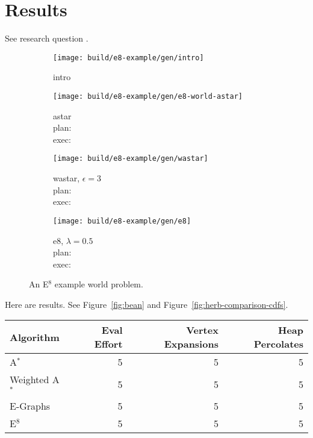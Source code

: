 \section{Results}

See research question \label{ques:e8-comparisons}.

\begin{figure}
   \centering
   
   
   
   \begin{subfigure}[t]{0.47\textwidth}
      \centering
      \texttt{[image: build/e8-example/gen/intro]}
      \caption{intro}
   \end{subfigure}%
   \quad%
   \begin{subfigure}[t]{0.47\textwidth}
      \centering
      \texttt{[image: build/e8-example/gen/e8-world-astar]}
      \caption{astar\\
         plan: \worldstatsastarplan\\
         exec: \worldstatsastarexec}
   \end{subfigure}%
   \quad%
   \begin{subfigure}[t]{0.47\textwidth}
      \centering
      \texttt{[image: build/e8-example/gen/wastar]}
      \caption{wastar, $\epsilon=3$\\
         plan: \worldstatswastarplan\\
         exec: \worldstatswastarexec}
   \end{subfigure}%
   \quad%
   \begin{subfigure}[t]{0.47\textwidth}
      \centering
      \texttt{[image: build/e8-example/gen/e8]}
      \caption{e8, $\lambda=0.5$\\
         plan: \worldstatseEplan\\
         exec: \worldstatseEexec}
   \end{subfigure}
   \caption{An E$^8$ example world problem.}
\end{figure}

Here are results.
See Figure~\ref{fig:bean} and Figure~\ref{fig:herb-comparison-cdfs}.

\begin{center}
\begin{tabular}{lrrr}
\toprule
Algorithm & Eval Effort & Vertex Expansions & Heap Percolates \\
\midrule
A$^*$ & 5 & 5 & 5 \\
Weighted A$^*$ & 5 & 5 & 5 \\
E-Graphs & 5 & 5 & 5 \\
E$^8$ & 5 & 5 & 5 \\
\bottomrule
\end{tabular}
\end{center}
